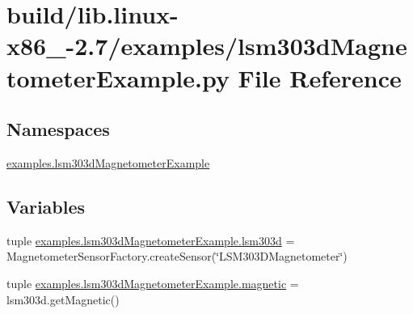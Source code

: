\hypertarget{build_2lib_8linux-x86__64-2_87_2examples_2lsm303dMagnetometerExample_8py}{}\section{build/lib.linux-\/x86\+\_-\/2.7/examples/lsm303d\+Magnetometer\+Example.py File Reference}
\label{build_2lib_8linux-x86__64-2_87_2examples_2lsm303dMagnetometerExample_8py}
\subsection*{Namespaces}
\begin{DoxyCompactItemize}
\item 
 \hyperlink{namespaceexamples_1_1lsm303dMagnetometerExample}{examples.\+lsm303d\+Magnetometer\+Example}
\end{DoxyCompactItemize}
\subsection*{Variables}
\begin{DoxyCompactItemize}
\item 
tuple \hyperlink{namespaceexamples_1_1lsm303dMagnetometerExample_afe72d3215980bd73c190d8ecd30e7ab1}{examples.\+lsm303d\+Magnetometer\+Example.\+lsm303d} = Magnetometer\+Sensor\+Factory.\+create\+Sensor(\char`\"{}L\+S\+M303\+D\+Magnetometer\char`\"{})
\item 
tuple \hyperlink{namespaceexamples_1_1lsm303dMagnetometerExample_aa8e2a55c37895144a145c9ca82878b3c}{examples.\+lsm303d\+Magnetometer\+Example.\+magnetic} = lsm303d.\+get\+Magnetic()
\end{DoxyCompactItemize}
